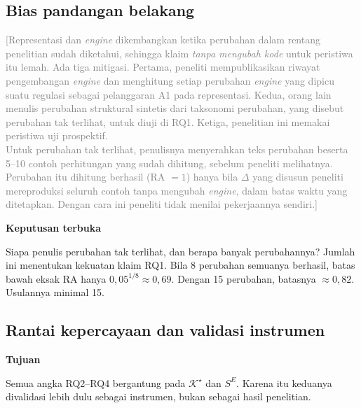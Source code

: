 \documentclass[journal,a4paper]{IEEEtran}
\newcommand{\en}[1]{\textit{#1}}
\newcommand{\K}{\mathcal{K}}
\newcommand{\emas}{\star}
\newcommand{\SE}{S^{E}}
\newif\ifrancangan \rancangantrue
\newcommand{\kotak}[3]{\ifrancangan\par\begingroup\scriptsize
  \def\FrameCommand{\fboxsep=3pt\fboxrule=0.4pt\fcolorbox{#1!60!black}{#1!6}}%
  \MakeFramed{\advance\hsize-\width\FrameRestore}\noindent\textbf{#2}\par #3\endMakeFramed\endgroup\fi}
\newcommand{\tujuan}[1]{\kotak{blue}{Tujuan}{#1}}
\newcommand{\keputusan}[1]{\kotak{orange}{Keputusan terbuka}{#1}}
\newcommand{\isian}[1]{\ifrancangan\textcolor{gray}{[#1]}\fi}
\begin{document}
\subsection{Bias pandangan belakang}
\label{subsec:hindsight}
\isian{Representasi dan \en{engine} dikembangkan ketika perubahan dalam rentang penelitian sudah diketahui, sehingga klaim \emph{tanpa mengubah kode} untuk peristiwa itu lemah. Ada tiga mitigasi. Pertama, peneliti mempublikasikan riwayat pengembangan \en{engine} dan menghitung setiap perubahan \en{engine} yang dipicu suatu regulasi sebagai pelanggaran A1 pada representasi. Kedua, orang lain menulis perubahan struktural sintetis dari taksonomi perubahan, yang disebut perubahan tak terlihat, untuk diuji di RQ1. Ketiga, penelitian ini memakai peristiwa uji prospektif.\\
Untuk perubahan tak terlihat, penulisnya menyerahkan teks perubahan beserta 5--10 contoh perhitungan yang sudah dihitung, sebelum peneliti melihatnya. Perubahan itu dihitung berhasil (RA $=1$) hanya bila $\Delta$ yang disusun peneliti mereproduksi seluruh contoh tanpa mengubah \en{engine}, dalam batas waktu yang ditetapkan. Dengan cara ini peneliti tidak menilai pekerjaannya sendiri.}

\keputusan{Siapa penulis perubahan tak terlihat, dan berapa banyak perubahannya? Jumlah ini menentukan kekuatan klaim RQ1. Bila 8 perubahan semuanya berhasil, batas bawah eksak RA hanya $0{,}05^{1/8} \approx 0{,}69$. Dengan 15 perubahan, batasnya $\approx 0{,}82$. Usulannya minimal 15.}

\subsection{Rantai kepercayaan dan validasi instrumen}
\label{subsec:instrumen}
\tujuan{Semua angka RQ2--RQ4 bergantung pada $\K^{\emas}$ dan $\SE$. Karena itu keduanya divalidasi lebih dulu sebagai instrumen, bukan sebagai hasil penelitian.}
\end{document}
